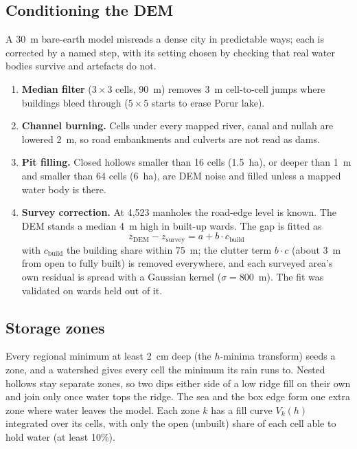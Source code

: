 \documentclass[11pt,a4paper]{article}
\begin{document}
\subsection{Conditioning the DEM}
A 30~m bare-earth model misreads a dense city in predictable ways; each is corrected
by a named step, with its setting chosen by checking that real water bodies survive
and artefacts do not.
\begin{enumerate}
  \item \textbf{Median filter} ($3\times3$ cells, 90~m) removes 3~m
        cell-to-cell jumps where buildings bleed through ($5\times5$ starts to erase
        Porur lake).
  \item \textbf{Channel burning.} Cells under every mapped river, canal and nullah are
        lowered 2~m, so road embankments and culverts are not read as dams.
  \item \textbf{Pit filling.} Closed hollows smaller than 16 cells (1.5~ha), or deeper
        than 1~m and smaller than 64 cells (6~ha), are DEM noise and filled \textendash{}
        unless a mapped water body is there.
  \item \textbf{Survey correction.} At 4,523 manholes the road-edge level is known.
        The DEM stands a median 4~m high in built-up wards. The gap is fitted as
        \begin{equation}
          z_{\text{DEM}} - z_{\text{survey}} = a + b\cdot c_{\text{build}}
        \end{equation}
        with $c_{\text{build}}$ the building share within 75~m; the clutter term
        $b\cdot c$ (about 3~m from open to fully built) is removed everywhere, and each
        surveyed area's own residual is spread with a Gaussian kernel
        ($\sigma = 800$~m). The fit was validated on wards held out of it.
\end{enumerate}

\subsection{Storage zones}
Every regional minimum at least 2~cm deep (the $h$-minima transform) seeds a zone, and
a watershed gives every cell the minimum its rain runs to. Nested hollows stay separate
zones, so two dips either side of a low ridge fill on their own and join only once
water tops the ridge. The sea and the box edge form one extra zone where water leaves
the model. Each zone $k$ has a fill curve $V_k(h)$ integrated over its cells, with only
the open (unbuilt) share of each cell able to hold water (at least 10\%).
\end{document}
